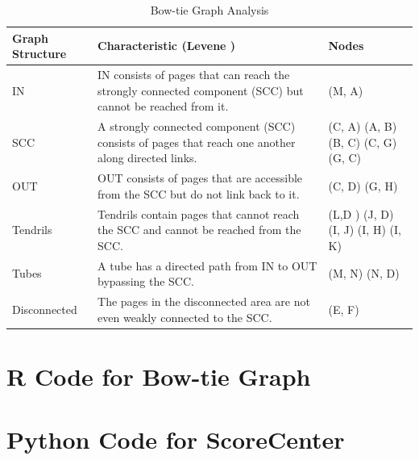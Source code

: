 \documentclass[letterpaper,11pt]{report}
\begin{document}
\begin{savenotes}
\begin{table}
    \begin{tabularx} {1.00\textwidth} {|l|X|X|}
    \hline
    Graph Structure & Characteristic (Levene \cite{levene2011introduction})                                                    & Nodes                         \\ \hline
    IN              & IN consists of pages that can reach the strongly connected component (SCC) but cannot be reached from it. & (M, A)                         \\ \hline
    SCC             & A strongly connected component (SCC) consists of pages that reach one another along directed links.       & (C, A) (A, B) (B, C) (C, G) (G, C) \\ \hline
    OUT             & OUT consists of pages that are accessible from the SCC but do not link back to it.                       & (C, D) (G, H)                  \\ \hline
    Tendrils        & Tendrils contain pages that cannot reach the SCC and cannot be reached from the SCC.                      & (L,D ) (J, D) (I, J) (I, H) (I, K) \\ \hline
    Tubes           & A tube has a directed path from IN to OUT bypassing the SCC.                                             & (M, N) (N, D)                   \\ \hline
    Disconnected    & The pages in the disconnected area are not even weakly connected to the SCC.                             & (E, F)                         \\ \hline
    \end{tabularx}
    \caption {Bow-tie Graph Analysis}
			\label{tab:bowtie}
\end{table}
\end{savenotes}




\appendix
{}

\chapter{R Code for Bow-tie Graph} \label{chap:R Source}

\chapter{Python Code for ScoreCenter} \label{chap:Python Source}

\end{document}
